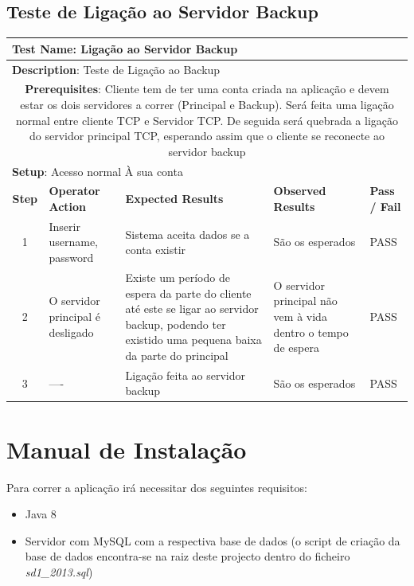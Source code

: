 \documentclass[12pt]{article} %
\begin{document}
\subsection{Teste de Ligação ao Servidor Backup}
\begin{table}[ht!]
	\begin{tabular}{|c|p{4cm}|p{4cm}|p{3cm}|p{1cm}|}
		\hline
		\multicolumn{5}{|l|}{\textbf{Test Name}: Ligação ao Servidor Backup}\\
		\hline
		\multicolumn{5}{|l|}{\textbf{Description}: Teste de Ligação ao Backup}\\
		\hline
		\multicolumn{5}{|p{14,5cm}|}{\textbf{Prerequisites}: Cliente tem de ter uma conta criada na aplicação e devem estar os dois servidores a correr (Principal e Backup). Será feita uma ligação normal entre cliente TCP e Servidor TCP. De seguida será quebrada a ligação do servidor principal TCP, esperando assim que o cliente se reconecte ao servidor backup}\\
		\hline
		\multicolumn{5}{|l|}{\textbf{Setup}: Acesso normal À sua conta}\\
		\hline
		\textbf{Step} & \textbf{Operator Action} & \textbf{Expected Results} & \textbf{Observed Results} & \textbf{Pass / Fail}\\
		\hline
		1 & Inserir username, password & Sistema aceita dados se a conta existir & São os esperados & PASS\\
		\hline
		2 & O servidor principal é desligado & Existe um período de espera da parte do cliente até este se ligar ao servidor backup, podendo ter existido uma pequena baixa da parte do principal & O servidor principal não vem à vida dentro o tempo de espera & PASS\\
		\hline
		3 & ---- & Ligação feita ao servidor backup & São os esperados & PASS\\
		\hline
	\end{tabular}
\end{table}




\newpage
\section{Manual de Instalação}
\label{sec:install}
Para correr a aplicação irá necessitar dos seguintes requisitos:
\begin{itemize}
	\item Java 8
	\item Servidor com MySQL com a respectiva base de dados (o script de criação da base de dados encontra-se na raiz deste projecto dentro do ficheiro \emph{sd1\_2013.sql})
\end{itemize}
\end{document}
